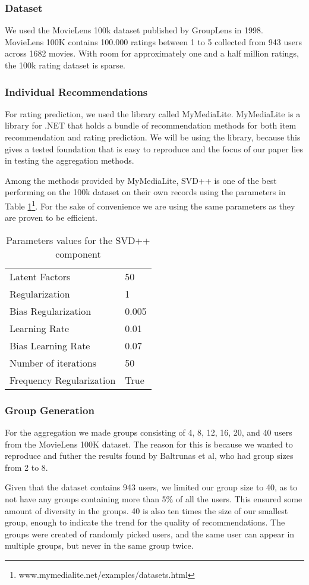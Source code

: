 \subsubsection{Dataset}\label{sec:dataset}
We used the MovieLens 100k dataset published by GroupLens in 1998\cite{movielens100k}. MovieLens 100K contains 100.000 ratings between 1 to 5 collected from 943 users across 1682 movies. With room for approximately one and a half million ratings, the 100k rating dataset is sparse. 

\subsubsection{Individual Recommendations}\label{sec:individualrecommendation}
For rating prediction, we used the library called MyMediaLite\cite{mymedialite}. MyMediaLite is a library for .NET that holds a bundle of recommendation methods for both item recommendation and rating prediction. We will be using the library, because this gives a tested foundation that is easy to reproduce and the focus of our paper lies in testing the aggregation methods.

Among the methods provided by MyMediaLite, SVD++ is one of the best performing on the 100k dataset on their own records using the parameters in Table \ref{tbl:svdpp}\footnote{www.mymedialite.net/examples/datasets.html}. For the sake of convenience we are using the same parameters as they are proven to be efficient.

\begin{table}[H]
	\centering
	\begin{tabular}{|l|l|}\hline
		Latent Factors & 50 \\
		Regularization & 1	\\
		Bias Regularization & 0.005	\\
		Learning Rate & 0.01 \\
		Bias Learning Rate & 0.07 \\ 
		Number of iterations & 50 \\
		Frequency Regularization & True \\\hline
	\end{tabular}
	\caption{Parameters values for the SVD++ component}
	\label{tbl:svdpp}
\end{table}

\subsubsection{Group Generation}\label{sec:groupgeneration}
For the aggregation we made groups consisting of 4, 8, 12, 16, 20, and 40 users from the MovieLens 100K dataset. The reason for this is because we wanted to reproduce and futher the results found by Baltrunas et al\cite{Baltrunas:2010:GRR:1864708.1864733}, who had group sizes from 2 to 8.

Given that the dataset contains 943 users, we limited our group size to 40, as to not have any groups containing more than 5\% of all the users. This ensured some amount of diversity in the groups. 40 is also ten times the size of our smallest group, enough to indicate the trend for the quality of recommendations. The groups were created of randomly picked users, and the same user can appear in multiple groups, but never in the same group twice.